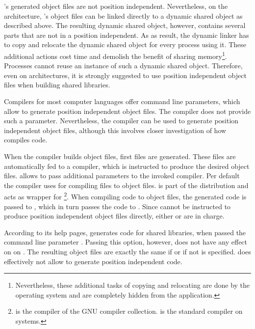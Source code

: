 \Aldor's generated object files are not position independent. Nevertheless, on the \xeightysix architecture, \Aldor's object files can be linked directly to a dynamic shared object as described above. The resulting dynamic shared object, however, contains several parts that are not in a position independent. As as result, the dynamic linker has to copy and relocate the dynamic shared object for every process using it. These additional actions cost time and demolish the benefit of sharing memory\footnote{Nevertheless, these additional tasks of copying and relocating are done by the operating system and are completely hidden from the application.}. Processes cannot reuse an instance of such a dynamic shared object. Therefore, even on \xeightysix architectures, it is strongly suggested to use position independent object files when building shared libraries. 

Compilers for most computer languages offer command line parameters, which allow to generate position independent object files. The \Aldor compiler does not provide such a parameter. Nevertheless, the \Aldor compiler can be used to generate position independent object files, although this involves closer investigation of how \Aldor compiles code. 

When the \Aldor compiler builds object files, first  files are generated. These  files are automatically fed to a \C compiler, which is instructed to produce the desired object files. \Aldor allows to pass additional parameters to the invoked \C compiler. Per default the \Aldor compiler uses \Unicl for compiling  files to object files. \Unicl is part of the \Aldor distribution and acts as wrapper for \Gcc{}\footnote{\Gcc is the \C compiler of the GNU compiler collection\cite{GCC}. \Gcc is the standard \C compiler on \GNULinux systems.}. When compiling \Aldor code to object files, the generated \C code is passed to \Unicl, which in turn passes the \C code to \Gcc. Since \Aldor cannot be instructed to produce position independent object files directly, either \Unicl or \Gcc are in charge. 

According to its help pages, \Unicl generates code for shared libraries, when passed the command line parameter . Passing this option, however, does not have any effect on \GNULinux on \xeightysix. The resulting object files are exactly the same if or if not  is specified. \Unicl does effectively not allow to generate position independent code.

